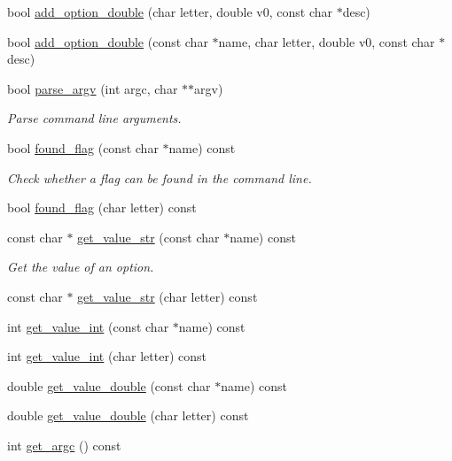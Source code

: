 \begin{DoxyCompactItemize}
\item 
bool \hyperlink{class_anyarg_a616fa92a586900e277bfc6222428f544}{add\-\_\-option\-\_\-double} (char letter, double v0, const char $\ast$desc)
\item 
bool \hyperlink{class_anyarg_ad5f726956b9525fce547f359bbdcddfc}{add\-\_\-option\-\_\-double} (const char $\ast$name, char letter, double v0, const char $\ast$desc)
\item 
bool \hyperlink{class_anyarg_ab38a13c5d241224bb14d8e474bbe70de}{parse\-\_\-argv} (int argc, char $\ast$$\ast$argv)
\begin{DoxyCompactList}\small\item\em Parse command line arguments. \end{DoxyCompactList}\item 
bool \hyperlink{class_anyarg_a1305e8be180c7247cb9bdb0994b00597}{found\-\_\-flag} (const char $\ast$name) const 
\begin{DoxyCompactList}\small\item\em Check whether a flag can be found in the command line. \end{DoxyCompactList}\item 
bool \hyperlink{class_anyarg_a8663ada26b0add34878d0929dc436fc5}{found\-\_\-flag} (char letter) const 
\item 
const char $\ast$ \hyperlink{class_anyarg_a9788b24659c4b7ab69cfb8b1f55f1c15}{get\-\_\-value\-\_\-str} (const char $\ast$name) const 
\begin{DoxyCompactList}\small\item\em Get the value of an option. \end{DoxyCompactList}\item 
const char $\ast$ \hyperlink{class_anyarg_a8b5d891a9e146c17cd4d8038c5265fcc}{get\-\_\-value\-\_\-str} (char letter) const 
\item 
int \hyperlink{class_anyarg_ae254a7571efbf058ad98fcd00a176470}{get\-\_\-value\-\_\-int} (const char $\ast$name) const 
\item 
int \hyperlink{class_anyarg_a2c45edbcd6de87992c227c3994eb7e72}{get\-\_\-value\-\_\-int} (char letter) const 
\item 
double \hyperlink{class_anyarg_a8d46bd713bb7bc5bd303e23afd5609d1}{get\-\_\-value\-\_\-double} (const char $\ast$name) const 
\item 
double \hyperlink{class_anyarg_ad607e8d76b475ff3c5a9ccb4032258d7}{get\-\_\-value\-\_\-double} (char letter) const 
\item 
int \hyperlink{class_anyarg_a3cffbadc85f2fd4086e9a91ac1c5d666}{get\-\_\-argc} () const 
$$
\end{DoxyCompactItemize}
